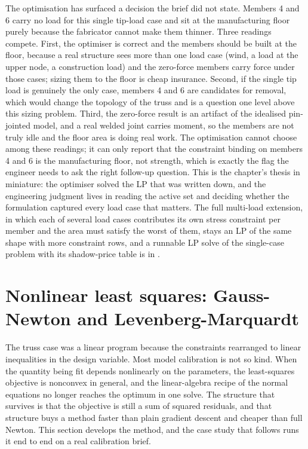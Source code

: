 The optimisation has surfaced a decision the brief did not state.
Members 4 and 6 carry no load for this single tip-load case and sit
at the manufacturing floor purely because the fabricator cannot
make them thinner. Three readings compete. First, the optimiser is
correct and the members should be built at the floor, because a
real structure sees more than one load case (wind, a load at the
upper node, a construction load) and the zero-force members carry
force under those cases; sizing them to the floor is cheap
insurance. Second, if the single tip load is genuinely the only
case, members 4 and 6 are candidates for removal, which would
change the topology of the truss and is a  question one level above this sizing problem.
Third, the zero-force result is an artifact of the idealised
pin-jointed model, and a real welded joint carries moment, so the
members are not truly idle and the floor area is doing real work.
The optimisation cannot choose among these readings; it can only
report that the constraint binding on members 4 and 6 is the
manufacturing floor, not strength, which is exactly the flag the
engineer needs to ask the right follow-up question. This is the
chapter's thesis in miniature: the optimiser solved the LP that was
written down, and the engineering judgment lives in reading the
active set and deciding whether the formulation captured every load
case that matters. The full multi-load extension, in which each of
several load cases contributes its own stress constraint per member
and the area must satisfy the worst of them, stays an LP of the same
shape with more constraint rows, and a runnable LP solve of the
single-case problem with its shadow-price table is in
.

\section{Nonlinear least squares: Gauss-Newton and
Levenberg-Marquardt}

The truss case was a linear program because the constraints rearranged
to linear inequalities in the design variable. Most model calibration
is not so kind. When the quantity being fit depends nonlinearly on the
parameters, the least-squares objective is nonconvex in general, and
the linear-algebra recipe of the normal equations no longer reaches the
optimum in one solve. The structure that survives is that the objective
is still a sum of squared residuals, and that structure buys a method
faster than plain gradient descent and cheaper than full Newton. This
section develops the method, and the case study that follows runs it
end to end on a real calibration brief.

